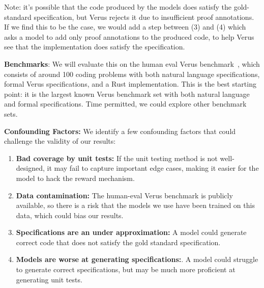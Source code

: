 \documentclass[11pt]{article}
\begin{document}
Note: it's possible that the code produced by the models does satisfy the gold-standard specification,
    but Verus rejects it due to insufficient proof annotations. 
    If we find this to be the case, 
    we would add a step between (3) and (4) which asks a model to add only proof annotations to the produced code,
    to help Verus see that the implementation does satisfy the specification.

\textbf{Benchmarks}: We will evaluate this on the human eval Verus
benchmark~\cite{alphaverus}, which consists of around 100 coding problems with
both natural language specifications, formal Verus specifications, and a Rust
implementation. This is the best starting point: it is the largest known Verus
benchmark set with both natural language and formal specifications. Time
permitted, we could explore other benchmark sets.

\textbf{Confounding Factors:} We identify a few confounding factors that could challenge the validity of our results:

\begin{enumerate}
    \item \textbf{Bad coverage by unit tests:} If the unit testing method is not well-designed, it may fail to capture important edge cases, making it easier for the model to hack the reward mechanism.
    \item \textbf{Data contamination:} The human-eval Verus benchmark is publicly available, so there is a risk that the models we use have been trained on this data, which could bias our results. 
    \item \textbf{Specifications are an under approximation:} A model could generate correct code that does not satisfy the gold standard specification.
    \item \textbf{Models are worse at generating specifications:}. A model could struggle to generate correct specifications, but may be much more proficient
    at generating unit tests.
\end{enumerate}



\end{document}
